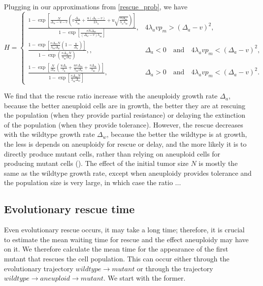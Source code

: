 \documentclass[12pt]{extarticle}
\begin{document}
Plugging in our approximations from \cref{rescue_prob}, we have
\begin{equation}\label{ratiorescue}
H = \begin{cases}
\frac{1-\exp\left[\frac{N}{\Delta_w-u-v}\left(v\frac{\Delta_m}{\lambda_m}+\frac{u\left(\Delta_a-v\right)}{2\lambda_a}+u\sqrt{\frac{v\Delta_m}{\lambda_a\lambda_m}}\right)\right]}{1-\exp\left[\frac{vN\Delta_m}{\left(\Delta_w-v\right)\lambda_m}\right]} ,&
4\lambda_avp_m>\left(\Delta_a-v\right)^2 ,\\
\frac{1-\exp\left[\frac{v\Delta_mN}{\lambda_m\Delta_w}\left(1-\frac{u}{\Delta_a}\right)\right]}{1-\exp\left(\frac{v\Delta_mN}{\lambda_m\Delta_w}\right)}, ,&
\Delta_a<0\quad\text{and}\quad4\lambda_avp_m<\left(\Delta_a-v\right)^2 ,\\
\frac{1-\exp\left[\frac{N}{\Delta_w}\left(\frac{u\Delta_a}{\lambda_a}+\frac{uv\Delta_m}{\lambda_m\Delta_a}+\frac{v\Delta_m}{\lambda_m}\right)\right]}{1-\exp\left[\frac{v\Delta_mN}{\lambda_m\Delta_w}\right]} ,&
\Delta_a>0\quad\text{and}\quad4\lambda_avp_m<\left(\Delta_a-v\right)^2. %
  \end{cases}
\end{equation}

We find that the rescue ratio increase with the aneuploidy growth rate $\Delta_a$, because the better aneuploid cells are in growth, the better they are at rescuing the population (when they provide partial resistance) or delaying the extinction of the population (when they provide tolerance). 
However, the rescue decreases with the wildtype growth rate $\Delta_w$, because the better the wildtype is at growth, the less is depends on aneuploidy for rescue or delay, and the more likely it is to directly produce mutant cells, rather than relying on aneuploid cells for producing mutant cells ().
The effect of the initial tumor size $N$ is mostly the same as the wildtype growth rate, except when aneuploidy provides tolerance and the population size is very large, in which case the ratio ... %

\subsection*{Evolutionary rescue time}

Even evolutionary rescue occurs, it may take a long time; therefore, it is crucial to estimate the mean waiting time for rescue and the effect aneuploidy may have on it. 
We therefore calculate the mean time for the appearance of the first mutant that rescues the cell population.
This can occur either through the evolutionary trajectory $wildtype \rightarrow mutant$ or through the trajectory $wildtype \rightarrow aneuploid \rightarrow mutant$.
We start with the former. 
\end{document}
